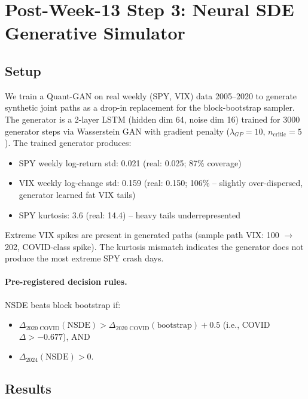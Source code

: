 \documentclass[11pt, a4paper]{article}
\begin{document}
\section{Post-Week-13 Step 3: Neural SDE Generative Simulator}
\label{sec:step3}

\subsection{Setup}

We train a Quant-GAN \citep{wiese2020} on real weekly (SPY, VIX) data
2005--2020 to generate synthetic joint paths as a drop-in replacement
for the block-bootstrap sampler. The generator is a 2-layer LSTM
(hidden dim 64, noise dim 16) trained for 3000 generator steps via
Wasserstein GAN with gradient penalty ($\lambda_{GP} = 10$,
$n_\text{critic} = 5$). The trained generator produces:
\begin{itemize}
  \item SPY weekly log-return std: 0.021 (real: 0.025; 87\% coverage)
  \item VIX weekly log-change std: 0.159 (real: 0.150; 106\% -- slightly
        over-dispersed, generator learned fat VIX tails)
  \item SPY kurtosis: 3.6 (real: 14.4) -- heavy tails underrepresented
\end{itemize}
Extreme VIX spikes are present in generated paths (sample path VIX:
100 $\to$ 202, COVID-class spike). The kurtosis mismatch indicates the
generator does not produce the most extreme SPY crash days.

\paragraph{Pre-registered decision rules.}
NSDE beats block bootstrap if:
\begin{itemize}
  \item $\Delta_{2020\text{ COVID}}(\text{NSDE}) > \Delta_{2020\text{ COVID}}(\text{bootstrap}) + 0.5$
        (i.e., COVID $\Delta > -0.677$), AND
  \item $\Delta_{2024}(\text{NSDE}) > 0$.
\end{itemize}

\subsection{Results}
\end{document}
